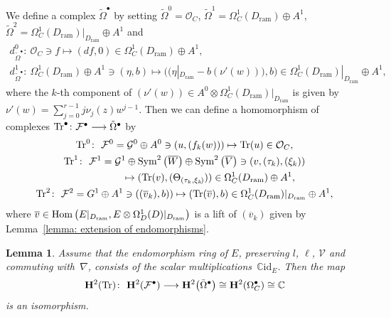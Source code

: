 \documentclass[pdftex]{sigma}
\numberwithin{equation}{section}
\newtheorem{Lemma}[Theorem]{Lemma}
\newcommand{\Tr}{\mathop{\rm Tr}\nolimits}
\newcommand\Hom{\mathop{\rm Hom}\nolimits}
\newcommand{\Sym}{\mathop{\rm Sym}\nolimits}
\begin{document}
We define a complex $\tilde{\Omega}^{\bullet}$ by setting
$\tilde{\Omega}^0={\mathcal O}_C$,
$\tilde{\Omega}^1=\Omega^1_C(D_{\mathrm{ram}})\oplus A^1$,
$\tilde{\Omega}^2=\Omega^1_C(D_{\mathrm{ram}})|_{D_{\mathrm{ram}}}\oplus A^1$
and
\begin{gather*}
 d_{\tilde{\Omega}^{\bullet}}^0
 \colon \
 {\mathcal O}_C \ni f \mapsto (df,0) \in \Omega^1_C(D_{\mathrm{ram}})\oplus A^1,
 \\
 d_{\tilde{\Omega}^{\bullet}}^1
 \colon \
 \Omega^1_C(D_{\mathrm{ram}}) \oplus A^1
 \ni (\eta, b) \mapsto ( (\eta|_{D_{\mathrm{ram}}}-b(\nu'(w))) , b)
 \in \Omega^1_C(D_{\mathrm{ram}})|_{D_{\mathrm{ram}}} \oplus A^1,
\end{gather*}
where the $k$-th component of
$(\nu'(w))\in A^0\otimes\Omega^1_C(D_{\mathrm{ram}})|_{D_{\mathrm{ram}}}$
is given by
$\nu'(w)=\sum_{j=0}^{r-1} j \nu_j(z)w^{j-1}$.
Then we can define a homomorphism of complexes
$\Tr^{\bullet}\colon
{\mathcal F}^{\bullet} \longrightarrow \tilde{\Omega}^{\bullet}$
by
\begin{gather*}
 \Tr^0
 \colon \
 {\mathcal F}^0={\mathcal G}^0 \oplus A^0
 \ni (u,(f_k(w))) \mapsto \Tr(u)\in {\mathcal O}_C,
 \\
 \Tr^1
 \colon \ {\mathcal F}^1={\mathcal G}^1\oplus \Sym^2\big(\overline{W}\big)\oplus \Sym^2\big(\overline{V}\big)
 \ni (v,(\tau_k),(\xi_k))\\
 \hphantom{\Tr^1 \colon \
 {\mathcal F}^1=}{} \mapsto (\Tr(v), (\Theta_{(\tau_k,\xi_k\!)})) \in
 \Omega^1_C(D_{\mathrm{ram}}) \oplus A^1,
 \\
 \Tr^2
 \colon \
 {\mathcal F}^2
 =G^1\oplus A^1
 \ni ((\overline{v}_k), b)) \mapsto ( \Tr(\overline{v}) , b )
 \in \Omega^1_C(D_{\mathrm{ram}})|_{D_{\mathrm{ram}}} \oplus A^1,
\end{gather*}
where $\overline{v}\in \Hom\big(E|_{D_{\mathrm{ram}}},E\otimes\Omega^1_D(D)|_{D_{\mathrm{ram}}}\big)$
is a lift of $(\overline{v}_k)$ given by
Lemma~\ref{lemma: extension of endomorphisms}.

\begin{Lemma}\label{lemma: trace map is isomorphic}
Assume that the endomorphism ring of $E$, preserving
$l$, $\ell$, ${\mathcal V}$ and commuting with~$\nabla$,
consists of the scalar multiplications~$\mathbb{C}\mathrm{id}_E$.
Then the map
\[
 \mathbf{H}^2(\Tr)\colon \
 \mathbf{H}^2({\mathcal F}^{\bullet})
 \longrightarrow \mathbf{H}^2\big(\tilde{\Omega}^{\bullet}\big)
 \cong \mathbf{H}^2(\Omega^{\bullet}_C)\cong\mathbb{C}
\]
is an isomorphism.
\end{Lemma}
\end{document}
